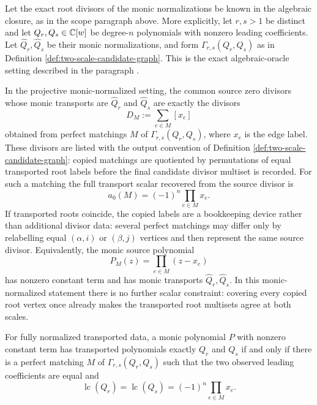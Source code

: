 \begin{theorem}\label{thm:two-scale-matching-inverse}
Let the exact root divisors of the monic normalizations be known in the
algebraic closure, as in the scope paragraph above.  More explicitly, let \(r,s>1\) be distinct and let
\(Q_r,Q_s\in\mathbb{C}[w]\) be degree-\(n\) polynomials with nonzero leading
coefficients.  Let \(\widehat Q_r,\widehat Q_s\) be their monic
normalizations, and form
\(\Gamma_{r,s}(Q_r,Q_s)\) as in Definition
\ref{def:two-scale-candidate-graph}.
This is the exact algebraic-oracle setting described in the paragraph
.

In the projective monic-normalized setting, the common source zero
divisors whose monic transports are \(\widehat Q_r\) and
\(\widehat Q_s\) are exactly the divisors
\[
D_M:=\sum_{e\in M}[x_e]
\]
obtained from perfect matchings \(M\) of
\(\Gamma_{r,s}(Q_r,Q_s)\), where \(x_e\) is the edge label.  These
divisors are listed with the output convention of Definition
\ref{def:two-scale-candidate-graph}: copied matchings are quotiented
by permutations of equal transported root labels before the final
candidate divisor multiset is recorded.  For such a matching the full
transport scalar recovered from the source divisor is
\[
a_0(M)=(-1)^n\prod_{e\in M}x_e .
\]
If transported roots coincide, the copied labels are a bookkeeping
device rather than additional divisor data: several perfect matchings
may differ only by relabelling equal \((\alpha,i)\) or \((\beta,j)\)
vertices and then represent the same source divisor.
Equivalently, the monic source polynomial
\[
P_M(z)=\prod_{e\in M}(z-x_e)
\]
has nonzero constant term and has monic transports
\(\widehat Q_r,\widehat Q_s\).  In this monic-normalized statement
there is no further scalar constraint: covering every copied root
vertex once already makes the transported root multisets agree at both
scales.

For fully normalized transported data, a monic polynomial \(P\) with
nonzero constant term has transported polynomials exactly \(Q_r\) and
\(Q_s\) if and only if there is a perfect matching \(M\) of
\(\Gamma_{r,s}(Q_r,Q_s)\) such that the two observed leading
coefficients are equal and
\[
\operatorname{lc}(Q_r)=\operatorname{lc}(Q_s)
=(-1)^n\prod_{e\in M}x_e .
\]
\end{theorem}

